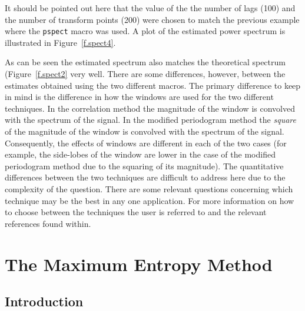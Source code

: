 It should be pointed 
out here that the value of the 
the number of lags (100) and the number of transform points (200)
were chosen to match the previous example where the {\tt pspect}
macro was used.
A plot of the estimated power spectrum is illustrated in
Figure~\ref{f.spect4}.
%

%
As can be seen the estimated spectrum also matches the theoretical spectrum
(Figure~\ref{f.spect2} very well.  There are some differences,
however, between the estimates obtained using the two different macros.
The primary difference to keep in mind is the difference in how the windows
are used for the two different techniques.  In the correlation
method the magnitude of the window is convolved with the
spectrum of the signal.  In the modified periodogram method the {\em square}
of the magnitude of the window is convolved with the spectrum of the signal.
Consequently, the effects of windows are different in each of the two cases
(for example, the side-lobes of the window are lower in the case of the 
modified periodogram method due to the squaring of its magnitude).
The quantitative differences between the two techniques are difficult
to address here due to the complexity of the question.  There are some
relevant questions concerning which technique may be the best in any
one application.  For more information on how to choose between the
techniques the user is referred to \cite{rabiner} and the relevant references
found within.


\section{The Maximum Entropy Method}
\subsection{Introduction}

